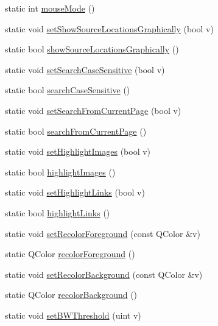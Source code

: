 \begin{DoxyCompactItemize}
\item 
static int \hyperlink{classOkular_1_1Settings_a7ee1bf195d1f1bc9247d4d754eade3af}{mouse\+Mode} ()
\item 
static void \hyperlink{classOkular_1_1Settings_a8ddbde1fc77cea6e75fa4874f4b934e3}{set\+Show\+Source\+Locations\+Graphically} (bool v)
\item 
static bool \hyperlink{classOkular_1_1Settings_ad2f9959b9eaec566544ea59dc85027f6}{show\+Source\+Locations\+Graphically} ()
\item 
static void \hyperlink{classOkular_1_1Settings_ae15c5e6532c948fd958ead0b3a4524ea}{set\+Search\+Case\+Sensitive} (bool v)
\item 
static bool \hyperlink{classOkular_1_1Settings_a5a180500ece739624ca9660269cf5b94}{search\+Case\+Sensitive} ()
\item 
static void \hyperlink{classOkular_1_1Settings_a6eba7e023d1809ce24cb12732eb9fb02}{set\+Search\+From\+Current\+Page} (bool v)
\item 
static bool \hyperlink{classOkular_1_1Settings_a35566e3dfcfe7ef7274678cbc55274b0}{search\+From\+Current\+Page} ()
\item 
static void \hyperlink{classOkular_1_1Settings_aaa70f5818832d3e1f7f37bd553fd1af4}{set\+Highlight\+Images} (bool v)
\item 
static bool \hyperlink{classOkular_1_1Settings_ac06da9fc231bc14154678d5e0a8e6d2e}{highlight\+Images} ()
\item 
static void \hyperlink{classOkular_1_1Settings_a64f142e36ea3be76642bae40374de8cb}{set\+Highlight\+Links} (bool v)
\item 
static bool \hyperlink{classOkular_1_1Settings_a841f6288f35104de5f362f5b35b13def}{highlight\+Links} ()
\item 
static void \hyperlink{classOkular_1_1Settings_ac91015e176ad9e6f7ba50f3905042ae2}{set\+Recolor\+Foreground} (const Q\+Color \&v)
\item 
static Q\+Color \hyperlink{classOkular_1_1Settings_a0e450deecd062a5c6029450106ea10b9}{recolor\+Foreground} ()
\item 
static void \hyperlink{classOkular_1_1Settings_a864eade17b5b677eed4b77b072b2f811}{set\+Recolor\+Background} (const Q\+Color \&v)
\item 
static Q\+Color \hyperlink{classOkular_1_1Settings_ab77e7176b2f25ffb10f9fdb10ce9108d}{recolor\+Background} ()
\item 
static void \hyperlink{classOkular_1_1Settings_a3feb8169fbc32f6ff13c30be999edd4f}{set\+B\+W\+Threshold} (uint v)

\end{DoxyCompactItemize}
